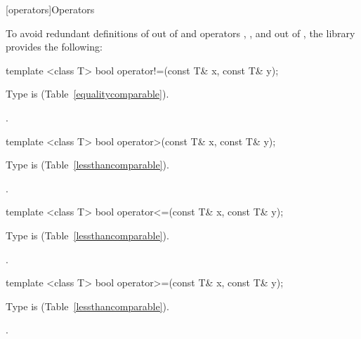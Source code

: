 [operators]{Operators}

\pnum
To avoid redundant definitions of  out of 
and operators \tcode{>}, \tcode{<=}, and \tcode{>=} out of ,
the library provides the following:

%
\begin{itemdecl}
template <class T> bool operator!=(const T& x, const T& y);
\end{itemdecl}

\begin{itemdescr}
\pnum
\requires
Type  is  (Table~\ref{equalitycomparable}).

\pnum
\returns
{}.
\end{itemdescr}

%
\begin{itemdecl}
template <class T> bool operator>(const T& x, const T& y);
\end{itemdecl}

\begin{itemdescr}
\pnum
\requires
Type  is  (Table~\ref{lessthancomparable}).

\pnum
\returns
{}.
\end{itemdescr}

%
\begin{itemdecl}
template <class T> bool operator<=(const T& x, const T& y);
\end{itemdecl}

\begin{itemdescr}
\pnum
\requires
Type  is  (Table~\ref{lessthancomparable}).

\pnum
\returns
{}.
\end{itemdescr}

%
\begin{itemdecl}
template <class T> bool operator>=(const T& x, const T& y);
\end{itemdecl}

\begin{itemdescr}
\pnum
\requires
Type  is  (Table~\ref{lessthancomparable}).

\pnum
\returns
{}.
\end{itemdescr}

